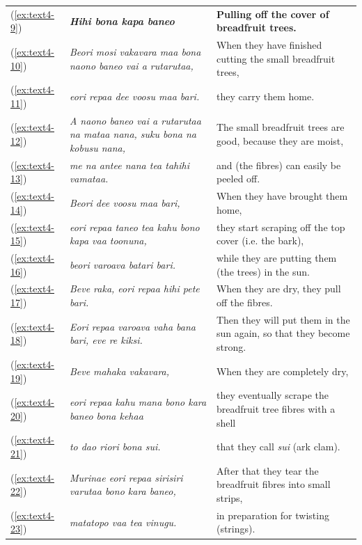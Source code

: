 \documentclass[output=paper]{langscibook}
\begin{document}
\begin{xltabular}{\textwidth}{lXX}
    (\ref{ex:text4-9})&\textit{\textbf{Hihi bona kapa baneo}}&\textbf{Pulling off the cover of breadfruit trees.}\\
    (\ref{ex:text4-10})&\textit{Beori mosi vakavara maa bona naono baneo vai a rutarutaa,}&When they have finished cutting the small breadfruit trees,\\
    (\ref{ex:text4-11})&\textit{eori repaa dee voosu maa bari.}&they carry them home.\\
    (\ref{ex:text4-12})&\textit{A naono baneo vai a rutarutaa na mataa nana, suku bona na kobusu nana,}&The small breadfruit trees are good, because they are moist,\\
    (\ref{ex:text4-13})&\textit{me na antee nana tea tahihi vamataa.}&and (the fibres) can easily be peeled off.\\
    (\ref{ex:text4-14})&\textit{Beori dee voosu maa bari,}&When they have brought them home, \\
    (\ref{ex:text4-15})&\textit{eori repaa taneo tea kahu bono kapa vaa toonuna,}&they start scraping off the top cover (i.e. the bark),\\
    (\ref{ex:text4-16})&\textit{beori varoava batari bari.}&while they are putting them (the trees) in the sun.\\
    (\ref{ex:text4-17})&\textit{Beve raka, eori repaa hihi pete bari.}&When they are dry, they pull off the fibres.\\
    (\ref{ex:text4-18})&\textit{Eori repaa varoava vaha bana bari, eve re kiksi.}&Then they will put them in the sun again, so that they become strong.\\
    (\ref{ex:text4-19})&\textit{Beve mahaka vakavara,}&When they are completely dry,\\
    (\ref{ex:text4-20})&\textit{eori repaa kahu mana bono kara baneo bona kehaa}&they eventually scrape the breadfruit tree fibres with a shell\\
    (\ref{ex:text4-21})&\textit{to dao riori bona sui.}&that they call \textit{sui} (ark clam).\\
    (\ref{ex:text4-22})&\textit{Murinae eori repaa sirisiri varutaa bono kara baneo,}&After that they tear the breadfruit fibres into small strips,\\
    (\ref{ex:text4-23})&\textit{matatopo vaa tea vinugu.}&in preparation for twisting (strings).\\
\end{xltabular}
\end{document}
